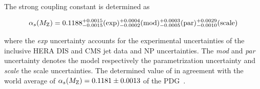 The strong coupling constant \asmz is determined as

\begin{equation*}
  \alpha_{s}(M_\mathrm{Z}) = 0.1188_{-0.0015}^{+0.0015}(\mathrm{exp})_{-0.0002}^{+0.0004}(\mathrm{mod})_{-0.0005}^{+0.0003}(\mathrm{par})_{-0.0010}^{+0.0029}(\mathrm{scale})
\end{equation*}

where the \emph{exp} uncertainty accounts for the experimental uncertainties of
the inclusive HERA DIS and CMS jet data and NP uncertainties. The \emph{mod}
and \emph{par} uncertainty denotes the model respectively the parametrization
uncertainty and \emph{scale} the scale uncertainties.  The determined value of
\asmz in agreement with the world average of $\alpha_{s}(M_\mathrm{Z})=0.1181\pm 0.0013$ of the
PDG~\cite{Agashe:2014kda}.
